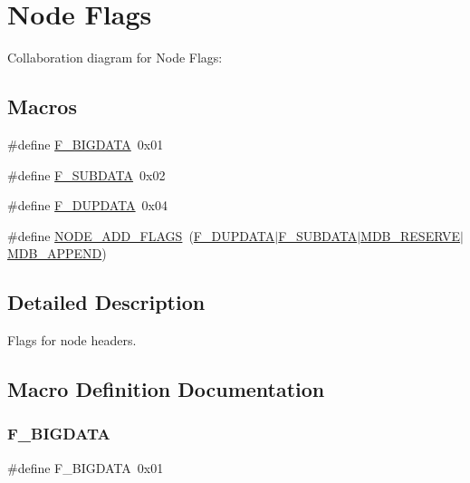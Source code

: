 \hypertarget{group__mdb__node}{}\section{Node Flags}
\label{group__mdb__node}
Collaboration diagram for Node Flags\+:
\subsection*{Macros}
\begin{DoxyCompactItemize}
\item 
\#define \mbox{\hyperlink{group__mdb__node_gafbd60c1d77d9343d044d0792754e42f0}{F\+\_\+\+B\+I\+G\+D\+A\+TA}}~0x01
\item 
\#define \mbox{\hyperlink{group__mdb__node_ga5323896692f7418870f72d7a5f1b2bab}{F\+\_\+\+S\+U\+B\+D\+A\+TA}}~0x02
\item 
\#define \mbox{\hyperlink{group__mdb__node_ga6e93fc5b62c03a0b85d0755b7d19bee5}{F\+\_\+\+D\+U\+P\+D\+A\+TA}}~0x04
\item 
\#define \mbox{\hyperlink{group__mdb__node_ga8dbbb28473b39ed9d19dc4e7b5b4dd52}{N\+O\+D\+E\+\_\+\+A\+D\+D\+\_\+\+F\+L\+A\+GS}}~(\mbox{\hyperlink{group__mdb__node_ga6e93fc5b62c03a0b85d0755b7d19bee5}{F\+\_\+\+D\+U\+P\+D\+A\+TA}}$\vert$\mbox{\hyperlink{group__mdb__node_ga5323896692f7418870f72d7a5f1b2bab}{F\+\_\+\+S\+U\+B\+D\+A\+TA}}$\vert$\mbox{\hyperlink{group__mdb__put_gac0545c6aea719991e3eae6ccc686efcc}{M\+D\+B\+\_\+\+R\+E\+S\+E\+R\+VE}}$\vert$\mbox{\hyperlink{group__mdb__put_ga06af7a6e87588fd723e2dd1d7e580e6a}{M\+D\+B\+\_\+\+A\+P\+P\+E\+ND}})
\end{DoxyCompactItemize}


\subsection{Detailed Description}
Flags for node headers. 

\subsection{Macro Definition Documentation}
\mbox{\label{group__mdb__node_gafbd60c1d77d9343d044d0792754e42f0}} 
\subsubsection{\texorpdfstring{F\+\_\+\+B\+I\+G\+D\+A\+TA}{F\_BIGDATA}}
{\footnotesize\ttfamily \#define F\+\_\+\+B\+I\+G\+D\+A\+TA~0x01}

